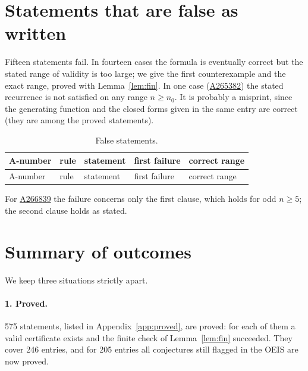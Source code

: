\documentclass[11pt]{article}
\theoremstyle{definition}
\theoremstyle{remark}
\newcommand{\oeis}[1]{\href{https://oeis.org/#1}{#1}}
\begin{document}
\begin{table}[ht]\centering\footnotesize\setlength{\tabcolsep}{4pt}
\caption{The 86 certificates: period $p$, start $t_0$, block lengths $\ell_B,\ell_D$, $L=\max_r|A_rB_rC_rD_rE_r|$, and the number of statements proved for the rule (``pr.''). The words themselves are in \texttt{results/certificates.json}.}\label{tab:cert}
\end{table}

\section{Statements that are false as written}\label{sec:false}

Fifteen statements fail. In fourteen cases the formula is eventually correct but the stated range of validity is too large; we give the first counterexample and the exact range, proved with Lemma~\ref{lem:fin}. In one case (\oeis{A265382}) the stated recurrence is not satisfied on any range $n\ge n_0$. It is probably a misprint, since the generating function and the closed forms given in the same entry are correct (they are among the proved statements).

\begin{longtable}{p{1.4cm}p{0.8cm}p{6.3cm}p{1.4cm}p{4cm}}
\caption{False statements.}\label{tab:false}\\
\toprule A-number & rule & statement & first failure & correct range\\\midrule\endfirsthead
\toprule A-number & rule & statement & first failure & correct range\\\midrule\endhead
\bottomrule
\end{longtable}
For \oeis{A266839} the failure concerns only the first clause, which holds for odd $n\ge5$; the second clause holds as stated.

\section{Summary of outcomes}\label{sec:outcomes}

We keep three situations strictly apart.

\paragraph{1. Proved.} 575 statements, listed in Appendix~\ref{app:proved}, are proved: for each of them a valid certificate exists and the finite check of Lemma~\ref{lem:fin} succeeded. They cover 246 entries, and for 205 entries all conjectures still flagged in the OEIS are now proved.
\end{document}
